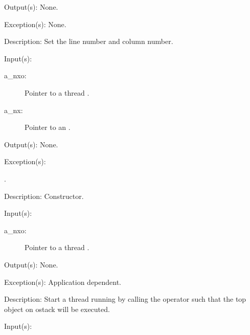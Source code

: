 \begin{capi}
\begin{capilist}
\begin{description}
		\end{description}
	\item[Output(s): ] None.
	\item[Exception(s): ] None.
	\item[Description: ]
		Set the line number and column number.
	\end{capilist}
\label{nxo_thread_new}
	\begin{capilist}
	\item[Input(s): ]
		\begin{description}\item[]
		\item[a\_nxo: ]
			Pointer to a thread .
		\item[a\_nx: ]
			Pointer to an .
		\end{description}
	\item[Output(s): ] None.
	\item[Exception(s): ]
		\begin{description}\item[]
		\item[.]
		\end{description}
	\item[Description: ]
		Constructor.
	\end{capilist}
\label{nxo_thread_start}
	\begin{capilist}
	\item[Input(s): ]
		\begin{description}\item[]
		\item[a\_nxo: ]
			Pointer to a thread \classname{nxo}.
		\end{description}
	\item[Output(s): ] None.
	\item[Exception(s): ] Application dependent.
	\item[Description: ]
		Start a thread running by calling the \onyxop{}{start}{}
		operator such that the top object on ostack will be executed.
	\end{capilist}
\label{nxo_thread_exit}
	\begin{capilist}
	\item[Input(s): ]

\end{capilist}
\end{capi}

